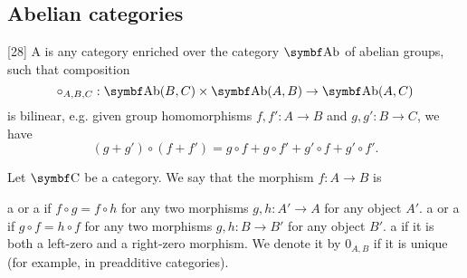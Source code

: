 \subsection{Abelian categories}\label{subsec:abelian_categories}

\begin{definition}\label{def:preadditive_category}\cite{MacLane1994}[28]
  A  is any category enriched over the category \( \Cat{Ab} \) of abelian groups, such that composition
  \begin{equation*}
    \circ_{A,B,C}: \Cat{Ab}(B, C) \times \Bold{Ab}(A, B) \to \Bold{Ab}(A, C)
  \end{equation*}
  is bilinear, e.g. given group homomorphisms \( f, f': A \to B \) and \( g, g': B \to C \), we have
  \begin{equation*}
    (g + g') \circ (f + f') = g \circ f + g \circ f' + g' \circ f + g' \circ f'.
  \end{equation*}
\end{definition}

\begin{definition}\label{def:zero_morphism}
  Let \( \Bold C \) be a category. We say that the morphism \( f: A \to B \) is
  \begin{defenum}
     a  or a  if \( f \circ g = f \circ h \) for any two morphisms \( g, h: A' \to A \) for any object \( A' \).
     a  or a  if \( g \circ f = h \circ f \) for any two morphisms \( g, h: B \to B' \) for any object \( B' \).
     a  if it is both a left-zero and a right-zero morphism. We denote it by \( 0_{A,B} \) if it is unique (for example, in preadditive categories).
  \end{defenum}
\end{definition}

